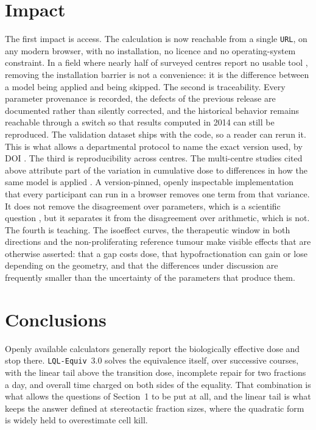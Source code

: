 \documentclass[preprint,12pt,number]{elsarticle}
\begin{document}
\section{Impact}
The first impact is access. The calculation is now reachable from a single \texttt{URL}, on any modern browser, with no installation, no licence and no operating-system constraint. In a field where nearly half of surveyed centres report no usable tool \cite{voyant2026standard}, removing the installation barrier is not a
convenience: it is the difference between a model being applied and being skipped. The second is traceability. Every parameter provenance is recorded, the
defects of the previous release are documented rather than silently corrected, and the historical behavior remains reachable through a switch so that results
computed in 2014 can still be reproduced. The validation dataset ships with the code, so a reader can rerun it. This is what allows a departmental protocol to
name the exact version used, by DOI \cite{lqlequivweb}. The third is reproducibility across centres. The multi-centre studies cited above attribute part of the variation in cumulative dose to differences in how the same model is applied \cite{wahlstedt2026,hardcastle2024,appelt2026}. A version-pinned, openly inspectable implementation that every participant can run in a browser removes one term from that variance. It does not remove the disagreement over parameters, which is a scientific question \cite{vanleeuwen2018}, but it separates it from the disagreement over arithmetic, which is not. The fourth is teaching. The isoeffect curves, the therapeutic window in both directions and the non-proliferating reference tumour make visible effects that are otherwise asserted: that a gap costs dose, that hypofractionation can gain or lose depending on the geometry, and that the differences under discussion are frequently smaller than the uncertainty of the parameters that produce them.

\section{Conclusions}
Openly available calculators generally report the biologically effective dose and stop there. \texttt{LQL-Equiv}~3.0 solves the equivalence itself, over successive courses, with the linear tail above the transition dose, incomplete repair for two fractions a day, and overall time charged on both sides of the equality. That combination is what allows the questions of Section~1 to be put at all, and the linear tail is what keeps the answer defined at stereotactic fraction sizes, where the quadratic form is widely held to overestimate cell kill.
\end{document}
